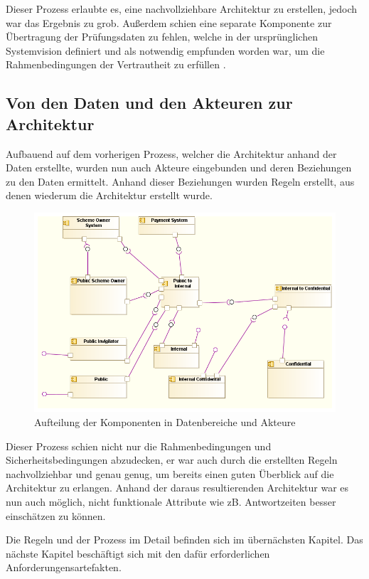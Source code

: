 Dieser Prozess erlaubte es, eine nachvollziehbare Architektur zu erstellen, jedoch war das Ergebnis zu grob. Außerdem schien eine separate Komponente zur  Übertragung der Prüfungsdaten zu fehlen, welche in der ursprünglichen Systemvision definiert und als notwendig empfunden worden war, um die Rahmenbedingungen der Vertrautheit zu erfüllen \cite[7.3]{ISO_CERT}.

\subsection{Von den Daten und den Akteuren zur Architektur}
Aufbauend auf dem vorherigen Prozess, welcher die Architektur anhand der Daten erstellte, wurden nun auch Akteure eingebunden und deren Beziehungen zu den Daten ermittelt. Anhand dieser Beziehungen wurden Regeln erstellt, aus denen wiederum die Architektur erstellt wurde.

\begin{figure}[!htbp]
    \centering
    \includegraphics[scale=0.55]{uml/vision4.png}
    \caption{Aufteilung der Komponenten in Datenbereiche und Akteure}
\end{figure}

Dieser Prozess schien nicht nur die Rahmenbedingungen und Sicherheitsbedingungen abzudecken, er war auch durch die erstellten Regeln nachvollziehbar und genau genug, um bereits einen guten Überblick auf die Architektur zu erlangen. Anhand der daraus resultierenden Architektur war es nun auch möglich, nicht funktionale Attribute wie zB. Antwortzeiten besser einschätzen zu können.

Die Regeln und der Prozess im Detail befinden sich im übernächsten Kapitel. Das nächste Kapitel beschäftigt sich mit den dafür erforderlichen Anforderungensartefakten.